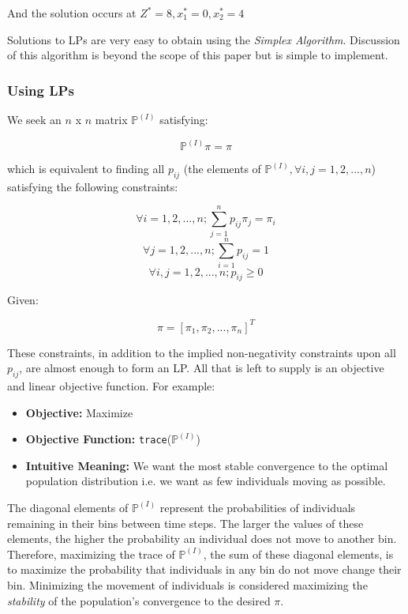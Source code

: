 \documentclass{article}
\begin{document}
And the solution occurs at $Z^* = 8, x_1^* = 0, x_2^* = 4$

Solutions to LPs are very easy to obtain using the \textit{Simplex Algorithm}. Discussion of this algorithm is beyond the scope of this paper but is simple to implement.

\subsubsection{Using LPs}
We seek an $n$ x $n$ matrix $\mathbb{P}^{(I)}$ satisfying:

\begin{equation}\label{eq:1}
    \mathbb{P}^{(I)}\pi = \pi
\end{equation}

which is equivalent to finding all $p_{ij}$ (the elements of $\mathbb{P}^{(I)}, \forall i,j=1,2,...,n$) satisfying the following constraints:

\[
\forall i=1,2,...,n ; \sum_{j=1}^n p_{ij}\pi_j = \pi_i
\]\[
\forall j=1,2,...,n ; \sum_{i=1}^n p_{ij} = 1
\]\[
\forall i,j=1,2,...,n ; p_{ij} \geq 0
\]

Given:

\[
\pi = [\pi_1, \pi_2, ..., \pi_n]^T
\]

These constraints, in addition to the implied non-negativity constraints upon all $p_{ij}$, are almost enough to form an LP. All that is left to supply is an objective and linear objective function. For example:

\begin{itemize}
  \item[] \textbf{Objective:} Maximize
  \item[] \textbf{Objective Function:} \texttt{trace}($\mathbb{P}^{(I)}$)
  \item[] \textbf{Intuitive Meaning:} We want the most stable convergence to the optimal population distribution i.e. we want as few individuals moving as possible.
\end{itemize}

The diagonal elements of $\mathbb{P}^{(I)}$ represent the probabilities of individuals remaining in their bins between time steps. The larger the values of these elements, the higher the probability an individual does not move to another bin. Therefore, maximizing the trace of $\mathbb{P}^{(I)}$, the sum of these diagonal elements, is to maximize the probability that individuals in any bin do not move change their bin. Minimizing the movement of individuals is considered maximizing the \textit{stability} of the population's convergence to the desired $\pi$.
\end{document}
